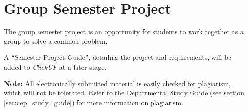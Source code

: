 \section{Group Semester Project}
    The group semester project is an opportunity for students to work together
    as a group to solve a common problem.

    A ``Semester Project Guide'', detailing the project and requirements, will be
    added to {\it ClickUP} at a later stage.

    \textbf{Note:} All electronically submitted material is easily checked for
    plagiarism, which will not be tolerated. Refer to the Departmental Study
    Guide (see section \ref{sec:dep_study_guide}) for more information on
    plagiarism.
